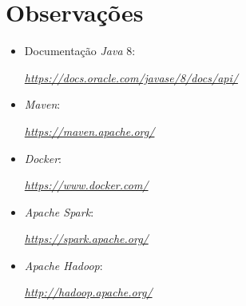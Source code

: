 \documentclass[a4paper]{report}
\begin{document}
\chapter{Observações} \label{ch:Observations}
\begin{itemize}
    \item Documentação \textit{Java} 8:
    \par \textit{\url{https://docs.oracle.com/javase/8/docs/api/}}
    \item \textit{Maven}:
    \par \textit{\url{https://maven.apache.org/}}
    \item \textit{Docker}:
    \par \textit{\url{https://www.docker.com/}}
    \item \textit{Apache Spark}:
    \par \textit{\url{https://spark.apache.org/}}
    \item \textit{Apache Hadoop}:
    \par \textit{\url{http://hadoop.apache.org/}}
\end{itemize}
\end{document}
